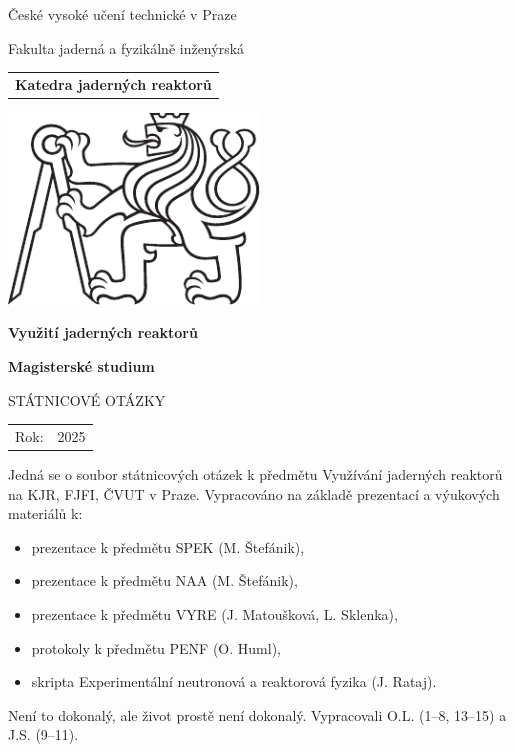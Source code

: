 \documentclass[a4paper, 11pt]{article}
\newcommand{\logoCVUT}{\includegraphics[width = 0.5\textwidth]{img/symbol_cvut_konturova_verze_cb.pdf}}
\begin{document}
\thispagestyle{empty}

\begin{center}
	{\LARGE
		České vysoké učení technické v Praze \par
		Fakulta jaderná a fyzikálně inženýrská
	}
    \vspace{10mm}

    \begin{tabular}{c}
		\textbf{Katedra jaderných reaktorů} \\[3pt]
    \end{tabular}

   \vspace{10mm} \logoCVUT \vspace{15mm}

   {\huge \textbf{Využití jaderných reaktorů}\par}
   \vspace{5mm}
   {\huge \textbf{Magisterské studium}\par}

   \vspace{15mm}
   {\Large \MakeUppercase{Státnicové otázky}}

   \vfill
   {\large
    \begin{tabular}{ll}
    Rok: & 2025
    \end{tabular}
   }
\end{center}

\newpage
\thispagestyle{empty}

\vfill

\vspace{1em}

Jedná se o soubor státnicových otázek k předmětu Využívání jaderných reaktorů na KJR, FJFI, ČVUT v Praze. Vypracováno na základě prezentací a výukových materiálů k:

\begin{itemize}
    \item prezentace k předmětu SPEK (M. Štefánik),
    \item prezentace k předmětu NAA (M. Štefánik),
    \item prezentace k předmětu VYRE (J. Matoušková, L. Sklenka),
    \item protokoly k předmětu PENF (O. Huml),
    \item skripta Experimentální neutronová a reaktorová fyzika (J. Rataj).
\end{itemize}

Není to dokonalý, ale život prostě není dokonalý. Vypracovali O.L. (1--8, 13--15) a J.S. (9--11).\\
\end{document}
